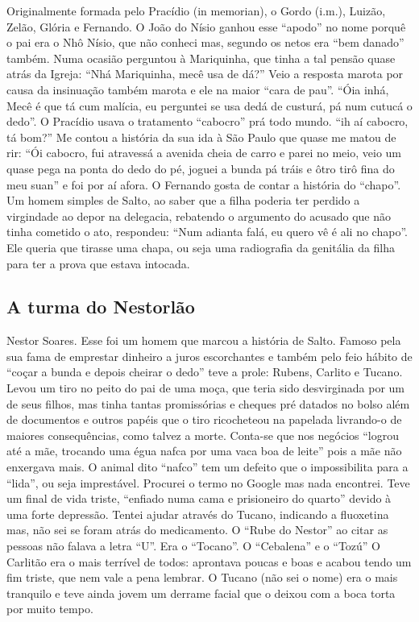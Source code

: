 \documentclass[12pt,brazil,]{book}
\begin{document}
Originalmente formada pelo Pracídio (in memorian), o Gordo (i.m.),
Luizão, Zelão, Glória e Fernando. O João do Nísio ganhou esse ``apodo''
no nome porquê o pai era o Nhô Nísio, que não conheci mas, segundo os
netos era ``bem danado'' também. Numa ocasião perguntou à Mariquinha,
que tinha a tal pensão quase atrás da Igreja: ``Nhá Mariquinha, mecê usa
de dá?'' Veio a resposta marota por causa da insinuação também marota e
ele na maior ``cara de pau''. ``Óia inhá, Mecê é que tá cum malícia, eu
perguntei se usa dedá de custurá, pá num cutucá o dedo''. O Pracídio
usava o tratamento ``cabocro'' prá todo mundo. ``ih aí cabocro, tá
bom?'' Me contou a história da sua ida à São Paulo que quase me matou de
rir: ``Ói cabocro, fui atravessá a avenida cheia de carro e parei no
meio, veio um quase pega na ponta do dedo do pé, joguei a bunda pá tráis
e ôtro tirô fina do meu suan'' e foi por aí afora. O Fernando gosta de
contar a história do ``chapo''. Um homem simples de Salto, ao saber que
a filha poderia ter perdido a virgindade ao depor na delegacia,
rebatendo o argumento do acusado que não tinha cometido o ato,
respondeu: ``Num adianta falá, eu quero vê é ali no chapo''. Ele queria
que tirasse uma chapa, ou seja uma radiografia da genitália da filha
para ter a prova que estava intocada.

\subsection{A turma do Nestorlão}\label{a-turma-do-nestorluxe3o}

Nestor Soares. Esse foi um homem que marcou a história de Salto. Famoso
pela sua fama de emprestar dinheiro a juros escorchantes e também pelo
feio hábito de ``coçar a bunda e depois cheirar o dedo'' teve a prole:
Rubens, Carlito e Tucano. Levou um tiro no peito do pai de uma moça, que
teria sido desvirginada por um de seus filhos, mas tinha tantas
promissórias e cheques pré datados no bolso além de documentos e outros
papéis que o tiro ricocheteou na papelada livrando-o de maiores
consequências, como talvez a morte. Conta-se que nos negócios ``logrou
até a mãe, trocando uma égua nafca por uma vaca boa de leite'' pois a
mãe não enxergava mais. O animal dito ``nafco'' tem um defeito que o
impossibilita para a ``lida'', ou seja imprestável. Procurei o termo no
Google mas nada encontrei. Teve um final de vida triste, ``enfiado numa
cama e prisioneiro do quarto'' devido à uma forte depressão. Tentei
ajudar através do Tucano, indicando a fluoxetina mas, não sei se foram
atrás do medicamento. O ``Rube do Nestor'' ao citar as pessoas não
falava a letra ``U''. Era o ``Tocano''. O ``Cebalena'' e o ``Tozú'' O
Carlitão era o mais terrível de todos: aprontava poucas e boas e acabou
tendo um fim triste, que nem vale a pena lembrar. O Tucano (não sei o
nome) era o mais tranquilo e teve ainda jovem um derrame facial que o
deixou com a boca torta por muito tempo.
\end{document}
